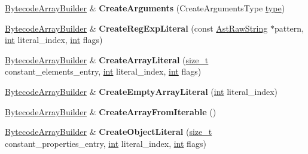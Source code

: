\begin{DoxyCompactItemize}
\mbox{\hyperlink{classv8_1_1internal_1_1interpreter_1_1BytecodeArrayBuilder}{Bytecode\+Array\+Builder}} \& {\bfseries Create\+Arguments} (Create\+Arguments\+Type \mbox{\hyperlink{classstd_1_1conditional_1_1type}{type}})
\item 
\mbox{\label{classv8_1_1internal_1_1interpreter_1_1BytecodeArrayBuilder_a53548cb728a50fc13ec224a0041a4211}} 
\mbox{\hyperlink{classv8_1_1internal_1_1interpreter_1_1BytecodeArrayBuilder}{Bytecode\+Array\+Builder}} \& {\bfseries Create\+Reg\+Exp\+Literal} (const \mbox{\hyperlink{classv8_1_1internal_1_1AstRawString}{Ast\+Raw\+String}} $\ast$pattern, \mbox{\hyperlink{classint}{int}} literal\+\_\+index, \mbox{\hyperlink{classint}{int}} flags)
\item 
\mbox{\label{classv8_1_1internal_1_1interpreter_1_1BytecodeArrayBuilder_af52924715a7a07894b0282e22c2fcdf6}} 
\mbox{\hyperlink{classv8_1_1internal_1_1interpreter_1_1BytecodeArrayBuilder}{Bytecode\+Array\+Builder}} \& {\bfseries Create\+Array\+Literal} (\mbox{\hyperlink{classsize__t}{size\+\_\+t}} constant\+\_\+elements\+\_\+entry, \mbox{\hyperlink{classint}{int}} literal\+\_\+index, \mbox{\hyperlink{classint}{int}} flags)
\item 
\mbox{\label{classv8_1_1internal_1_1interpreter_1_1BytecodeArrayBuilder_aa72384caf2e70d8de325e8278fb3816a}} 
\mbox{\hyperlink{classv8_1_1internal_1_1interpreter_1_1BytecodeArrayBuilder}{Bytecode\+Array\+Builder}} \& {\bfseries Create\+Empty\+Array\+Literal} (\mbox{\hyperlink{classint}{int}} literal\+\_\+index)
\item 
\mbox{\label{classv8_1_1internal_1_1interpreter_1_1BytecodeArrayBuilder_aa83a4821f5fb761511b0914030f4f23d}} 
\mbox{\hyperlink{classv8_1_1internal_1_1interpreter_1_1BytecodeArrayBuilder}{Bytecode\+Array\+Builder}} \& {\bfseries Create\+Array\+From\+Iterable} ()
\item 
\mbox{\label{classv8_1_1internal_1_1interpreter_1_1BytecodeArrayBuilder_ac6238ef25fb1176f93955ff159013b08}} 
\mbox{\hyperlink{classv8_1_1internal_1_1interpreter_1_1BytecodeArrayBuilder}{Bytecode\+Array\+Builder}} \& {\bfseries Create\+Object\+Literal} (\mbox{\hyperlink{classsize__t}{size\+\_\+t}} constant\+\_\+properties\+\_\+entry, \mbox{\hyperlink{classint}{int}} literal\+\_\+index, \mbox{\hyperlink{classint}{int}} flags)

\end{DoxyCompactItemize}
